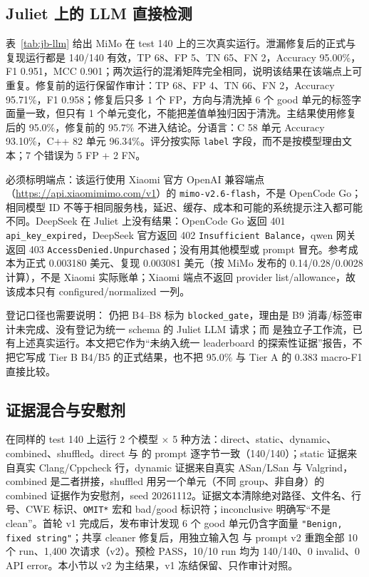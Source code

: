 \documentclass[conference]{IEEEtran}
\begin{document}
\subsection{Juliet 上的 LLM 直接检测}
表~\ref{tab:jb-llm} 给出 MiMo 在 test 140 上的三次真实运行。泄漏修复后的正式与复现运行都是 140/140 有效，TP 68、FP 5、TN 65、FN 2，Accuracy 95.00\%，F1 0.951，MCC 0.901；两次运行的混淆矩阵完全相同，说明该结果在该端点上可重复。修复前的运行保留作审计：TP 68、FP 4、TN 66、FN 2，Accuracy 95.71\%，F1 0.958；修复后只多 1 个 FP，方向与清洗掉 6 个 good 单元的标签字面量一致，但只有 1 个单元变化，不能把差值单独归因于清洗。主结果使用修复后的 95.0\%，修复前的 95.7\% 不进入结论。分语言：C 58 单元 Accuracy 93.10\%，C++ 82 单元 96.34\%。评分按实际 \texttt{label} 字段，而不是按模型理由文本；7 个错误为 5 FP + 2 FN。

必须标明端点：该运行使用 Xiaomi 官方 OpenAI 兼容端点（\url{https://api.xiaomimimo.com/v1}）的 \texttt{mimo-v2.6-flash}，不是 OpenCode Go；相同模型 ID 不等于相同服务栈，延迟、缓存、成本和可能的系统提示注入都可能不同。DeepSeek 在 Juliet 上没有结果：OpenCode Go 返回 401 \texttt{api\_key\_expired}，DeepSeek 官方返回 402 \texttt{Insufficient Balance}，qwen 网关返回 403 \texttt{AccessDenied.Unpurchased}；没有用其他模型或 prompt 冒充。参考成本为正式 0.003180 美元、复现 0.003081 美元（按 MiMo 发布的 0.14/0.28/0.0028 计算），不是 Xiaomi 实际账单；Xiaomi 端点不返回 provider list/allowance，故该成本只有 configured/normalized 一列。

登记口径也需要说明： 仍把 B4--B8 标为 \texttt{blocked\_gate}，理由是 B9 消毒/标签审计未完成、没有登记为统一 schema 的 Juliet LLM 请求；而  是独立子工作流，已有上述真实运行。本文把它作为“未纳入统一 leaderboard 的探索性证据”报告，不把它写成 Tier B B4/B5 的正式结果，也不把 95.0\% 与 Tier A 的 0.383 macro-F1 直接比较。

\subsection{证据混合与安慰剂}
 在同样的 test 140 上运行 2 个模型 $\times$ 5 种方法：direct、static、dynamic、combined、shuffled。direct 与  的 prompt 逐字节一致（140/140）；static 证据来自真实 Clang/Cppcheck 行，dynamic 证据来自真实 ASan/LSan 与 Valgrind，combined 是二者拼接，shuffled 用另一个单元（不同 group、非自身）的 combined 证据作为安慰剂，seed 20261112。证据文本清除绝对路径、文件名、行号、CWE 标识、\texttt{OMIT*} 宏和 bad/good 标识符；inconclusive 明确写“不是 clean”。首轮 v1 完成后，发布审计发现 6 个 good 单元仍含字面量 \texttt{"Benign, fixed string"}；共享 cleaner 修复后，用独立输入包  与 prompt v2 重跑全部 10 个 run、1{,}400 次请求（v2）。预检 PASS，10/10 run 均为 140/140、0 invalid、0 API error。本小节以 v2 为主结果，v1 冻结保留、只作审计对照。
\end{document}
